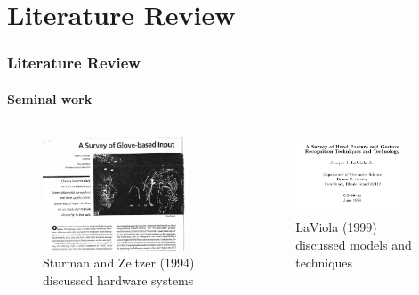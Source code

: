 \documentclass[xcolor={svgnames,table},10pt,fleqn]{beamer}
\begin{document}
\section{Literature Review}
\begin{frame}
    \frametitle{Literature Review}
    \framesubtitle{Seminal work}
    \begin{columns}
        \begin{column}{.5\textwidth}
            \begin{figure}
                \includegraphics[width=0.9\textwidth]{imgs/sturman.png}
                \caption{Sturman and Zeltzer (1994) discussed hardware systems}
            \end{figure}
        \end{column}
        \begin{column}{.5\textwidth}
            \begin{figure}
                \includegraphics[width=0.9\textwidth]{imgs/laviola.png}
                \caption{LaViola (1999) discussed models and techniques}
            \end{figure}
        \end{column}
    \end{columns}
\end{frame}
\end{document}
